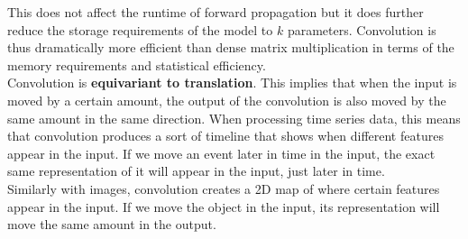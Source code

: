 \begin{multicols}{2}
	This does not affect the runtime of forward propagation but it does further reduce the storage requirements of the model to $k$ parameters.
	Convolution is thus dramatically more efficient than dense matrix multiplication in terms of the memory requirements and statistical efficiency.\\
	
	Convolution is \textbf{equivariant to translation}.
	This implies that when the input is moved by a certain amount, the output of the convolution is also moved by the same amount in the same direction.
	When processing time series data, this means that convolution produces a sort of timeline that shows when different features appear in the input.
	If we move an event later in time in the input, the exact same representation of it will appear in the input, just later in time.\\
	Similarly with images, convolution creates a 2D map of where certain features appear in the input. If we move the object in the input, its representation will move the same amount in the output.\\
	

\end{multicols}
